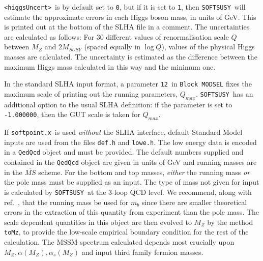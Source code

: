 \documentclass{article}
\def\SOFTSUSY{{\tt SOFTSUSY}}
\def\code#1{\small{\tt #1}\normalsize}
\begin{document}
\code{<higgsUncert>}~is by default set to \code{0}, but if it is set to
\code{1}, then \SOFTSUSY~will estimate the approximate errors in each Higgs
boson mass, in units of GeV. This is printed out at the bottom of the SLHA
file in a comment. 
The uncertainties are calculated as follows: For 30 different values of
renormalisation scale $Q$ between $M_Z$ and $2 M_{SUSY}$ (spaced equally in
$\log Q$), values of the
physical Higgs masses are calculated. The uncertainty is estimated as the
difference between the maximum Higgs mass calculated in this way and the
minimum one. 

In the standard SLHA input format, a parameter 
\code{12}~in \code{Block MODSEL} fixes the maximum scale of printing out the
running parameters, $Q_{max}$. \SOFTSUSY~has an additional option to the usual SLHA
definition: if the parameter is set to \code{-1.000000}, then the GUT scale is
taken for $Q_{max}$.

If \code{softpoint.x}~is used {\em without}\/ the SLHA interface, default
Standard Model inputs are used from the files \code{def.h} and \code{lowe.h}.
The low energy data is encoded in a \code{QedQcd} object and must be
provided. 
The default numbers supplied and contained in the \code{QedQcd} object 
are given in units of
GeV and running masses are in the $\overline{MS}$ scheme. 
For the bottom and
top masses, {\em either}\/ the running mass {\em 
  or}\/ the pole mass must be supplied as an input. The type of mass not given
for input is  calculated
by \SOFTSUSY~at the 3-loop QCD level. We recommend, along with
ref.~\cite{bottomMass}, that the
running mass be used for $m_b$ since there are smaller theoretical errors in
the 
extraction of this quantity from experiment than the pole mass. 
The scale dependent quantities in this object are then evolved to $M_Z$ by 
the method \code{toMz}, to provide the low-scale empirical boundary condition
for the rest of the calculation. The MSSM spectrum calculated depends most
crucially upon $M_Z, \alpha(M_Z), \alpha_s(M_Z)$ and input third family
fermion masses.
\end{document}
